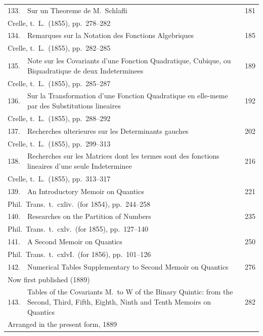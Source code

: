 \documentclass[11pt,a4paper]{article}
\theoremstyle{plain}
\begin{document}
\begin{longtable}{rp{8cm}l}
133. & Sur un Theoreme de M.\ Schlafli & 181\\
\multicolumn{3}{l}{\small Crelle, t.\ L.\ (1855), pp.\ 278--282}\\[0.5em]
134. & Remarques sur la Notation des Fonctions Algebriques & 185\\
\multicolumn{3}{l}{\small Crelle, t.\ L.\ (1855), pp.\ 282--285}\\[0.5em]
135. & Note sur les Covariants d'une Fonction Quadratique, Cubique, ou Biquadratique de deux Indeterminees & 189\\
\multicolumn{3}{l}{\small Crelle, t.\ L.\ (1855), pp.\ 285--287}\\[0.5em]
136. & Sur la Transformation d'une Fonction Quadratique en elle-meme par des Substitutions lineaires & 192\\
\multicolumn{3}{l}{\small Crelle, t.\ L.\ (1855), pp.\ 288--292}\\[0.5em]
137. & Recherches ulterieures sur les Determinants gauches & 202\\
\multicolumn{3}{l}{\small Crelle, t.\ L.\ (1855), pp.\ 299--313}\\[0.5em]
138. & Recherches sur les Matrices dont les termes sont des fonctions lineaires d'une seule Indeterminee & 216\\
\multicolumn{3}{l}{\small Crelle, t.\ L.\ (1855), pp.\ 313--317}\\[0.5em]
139. & An Introductory Memoir on Quantics & 221\\
\multicolumn{3}{l}{\small Phil.\ Trans.\ t.\ cxliv.\ (for 1854), pp.\ 244--258}\\[0.5em]
140. & Researches on the Partition of Numbers & 235\\
\multicolumn{3}{l}{\small Phil.\ Trans.\ t.\ cxlv.\ (for 1855), pp.\ 127--140}\\[0.5em]
141. & A Second Memoir on Quantics & 250\\
\multicolumn{3}{l}{\small Phil.\ Trans.\ t.\ cxlvI.\ (for 1856), pp.\ 101--126}\\[0.5em]
142. & Numerical Tables Supplementary to Second Memoir on Quantics & 276\\
\multicolumn{3}{l}{\small Now first published (1889)}\\[0.5em]
143. & Tables of the Covariants M.\ to W of the Binary Quintic: from the Second, Third, Fifth, Eighth, Ninth and Tenth Memoirs on Quantics & 282\\
\multicolumn{3}{l}{\small Arranged in the present form, 1889}\\[0.5em]

\end{longtable}
\end{document}
